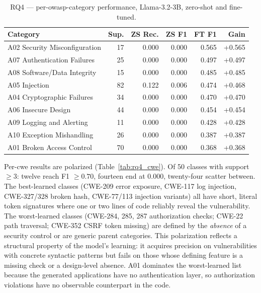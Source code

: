 \begin{table}[H]
\centering
\caption{RQ4 --- per-\gls{owasp}-category performance, Llama-3.2-3B, zero-shot and fine-tuned.}
\label{tab:rq4}
\footnotesize
\begin{tabular}{l r r r r r}
\toprule
\textbf{Category} & \textbf{Sup.} & \textbf{ZS Rec.} & \textbf{ZS F1} & \textbf{FT F1} & \textbf{Gain} \\
\midrule
A02 Security Misconfiguration & 17 & 0.000 & 0.000 & 0.565 & +0.565 \\
A07 Authentication Failures & 25 & 0.000 & 0.000 & 0.497 & +0.497 \\
A08 Software/Data Integrity & 15 & 0.000 & 0.000 & 0.485 & +0.485 \\
A05 Injection & 82 & 0.122 & 0.006 & 0.474 & +0.468 \\
A04 Cryptographic Failures & 34 & 0.000 & 0.000 & 0.470 & +0.470 \\
A06 Insecure Design & 44 & 0.000 & 0.000 & 0.454 & +0.454 \\
A09 Logging and Alerting & 11 & 0.000 & 0.000 & 0.428 & +0.428 \\
A10 Exception Mishandling & 26 & 0.000 & 0.000 & 0.387 & +0.387 \\
A01 Broken Access Control & 70 & 0.000 & 0.000 & 0.368 & +0.368 \\
\bottomrule
\end{tabular}
\end{table}

Per-\gls{cwe} results are polarized (Table~\ref{tab:rq4_cwe}). Of 50 classes with support $\geq 3$: twelve reach F1 $\geq 0.70$, fourteen end at 0.000, twenty-four scatter between. The best-learned classes (CWE-209 error exposure, CWE-117 log injection, CWE-327/328 broken hash, CWE-77/113 injection variants) all have short, literal token signatures where one or two lines of code reliably reveal the vulnerability. The worst-learned classes (CWE-284, 285, 287 authorization checks; CWE-22 path traversal; CWE-352 CSRF token missing) are defined by the \emph{absence} of a security control or are generic parent categories. This polarization reflects a structural property of the model's learning: it acquires precision on vulnerabilities with concrete syntactic patterns but fails on those whose defining feature is a missing check or a design-level absence. A01 dominates the worst-learned list because the generated applications have no authentication layer, so authorization violations have no observable counterpart in the code.

